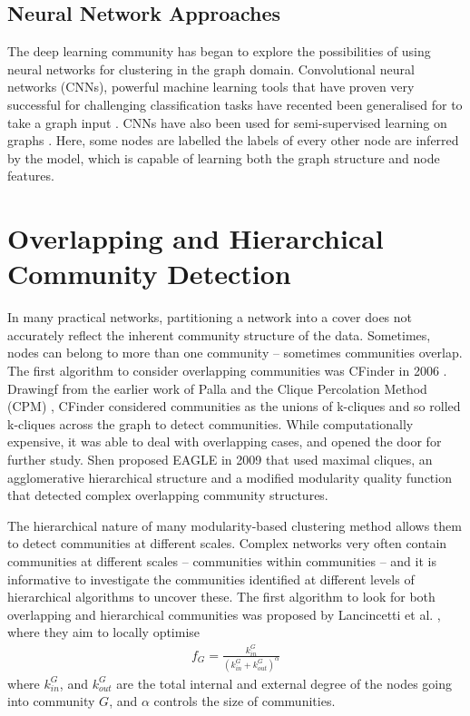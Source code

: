 \documentclass{report}
\begin{document}
\subsection{Neural Network Approaches}


The deep learning community has began to explore the possibilities of using neural networks for clustering in the graph domain. Convolutional neural networks (CNNs), powerful machine learning tools that have proven very successful for challenging classification tasks have recented been generalised for to take a graph input \cite{defferrard2016convolutional}. CNNs have also been used for semi-supervised learning on graphs \cite{kipf2016semi}. Here, some nodes are labelled the labels of every other node are inferred by the model, which is capable of learning both the graph structure and node features.  

\section{Overlapping and Hierarchical Community Detection}
In many practical networks, partitioning a network into a cover does not accurately reflect the inherent community structure of the data. Sometimes, nodes can belong to more than one community -- sometimes communities overlap. The first algorithm to consider overlapping communities was CFinder in 2006 \cite{adamcsek2006cfinder}. Drawingf from the earlier work of Palla and the Clique Percolation Method (CPM) \cite{palla2005uncovering}, CFinder considered communities as the unions of k-cliques and so rolled k-cliques across the graph to detect communities. While computationally expensive, it was able to deal with overlapping cases, and opened the door for further study. Shen proposed EAGLE in 2009 \cite{shen2009detect} that used maximal cliques, an agglomerative hierarchical structure and a modified modularity quality function that detected complex overlapping community structures.

The hierarchical nature of many modularity-based clustering method allows them to detect communities at different scales. Complex networks very often contain communities at different scales -- communities within communities -- and it is informative to investigate the communities identified at different levels of hierarchical algorithms to uncover these. The first algorithm to look for both overlapping and hierarchical communities was proposed by Lancincetti et al. \cite{lancichinetti2009detecting}, where they aim to locally optimise
\begin{align*}
f_G = \frac{k_{in}^G}{(k_{in}^G + k_{out}^G)^\alpha}
\end{align*}
where $k_{in}^G$, and $k_{out}^G$ are the total internal and external degree of the nodes going into community $G$, and $\alpha$ controls the size of communities. 
\end{document}
